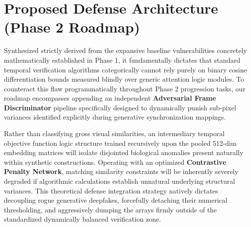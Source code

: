 \documentclass[conference]{IEEEtran}
\begin{document}
\section{Proposed Defense Architecture (Phase 2 Roadmap)}
Synthesized strictly derived from the expansive baseline vulnerabilities concretely mathematically established in Phase 1, it fundamentally dictates that standard temporal verification algorithms categorically cannot rely purely on binary cosine differentiation bounds measured blindly over generic attention logic modules. To counteract this flaw programmatically throughout Phase 2 progression tasks, our roadmap encompasses appending an independent \textbf{Adversarial Frame Discriminator} pipeline specifically designed to dynamically punish sub-pixel variances identified explicitly during generative synchronization mappings.

Rather than classifying gross visual similarities, an intermediary temporal objective function logic structure trained recursively upon the pooled 512-dim embedding matrices will isolate disjointed biological anomalies present naturally within synthetic constructions. Operating with an optimized \textbf{Contrastive Penalty Network}, matching similarity constraints will be inherently severely degraded if algorithmic calculations establish unnatural underlying structural variances. This theoretical defense integration strategy natively dictates decoupling rogue generative deepfakes, forcefully detaching their numerical thresholding, and aggressively dumping the arrays firmly outside of the standardized dynamically balanced verification zone.
\end{document}
